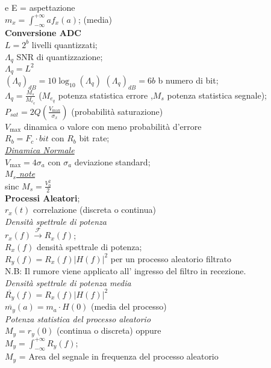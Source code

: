 \documentclass[a4paper]{article}
\begin{document}
\begin{multicols*}{3}
e E = aspettazione\\
$m_x=\int_{-\infty}^{+\infty} a f_x(a)$; (media)\\
\textbf{Conversione ADC} \\
$L=2^b$ livelli quantizzati; \\
${\Lambda_q}$ SNR di quantizzazione; \\
$\Lambda_q = L^2$ \\
${({\Lambda}_q)}_{dB}=10\log_{10}{(\Lambda_q)}$
${(\Lambda_q)}_{dB} = 6b$ b numero di bit; \\
${\Lambda}_q=\frac{M_s}{M_{e_q}}$ ($M_{e_q}$ potenza statistica errore
,$M_s$ potenza statistica segnale); \\
$P_{sat}=2Q(\frac{V_{\max}}{\sigma_x})$ (probabilità saturazione) \\
$V_{\max}$ dinamica o valore con meno probabilità d'errore \\
$R_b=F_c \cdot bit$ con $R_b$ bit rate; \\
\underline{\textit{Dinamica Normale}} \\
$V_{\max} = 4\sigma_a$ con $\sigma_a$ deviazione standard;\\ 
\underline{\textit{$M_s$ note}} \\
sinc $M_s = \frac{V_0^2}{2}$ \\
\textbf{Processi Aleatori}; \\
$r_x(t)$ correlazione (discreta o continua) \\
\textit{Densità spettrale di potenza} \\
$r_x(f) \xrightarrow{\mathscr{F}} R_x(f)$; \\ 
$R_x(f)$ densità spettrale di potenza; \\
$R_y(f) = R_x(f) |H(f)|^2$ per un processo aleatorio filtrato\\
N.B: Il rumore viene applicato all' ingresso del filtro in recezione. \\
\textit{Densità spettrale di potenza media} \\
$\overline{R_y}(f) = R_x(f) |H(f)|^2$ \\
$\overline{m_y}(a)=m_a\cdot H(0)$ (media del processo)\\
\textit{Potenza statistica del processo aleatorio} \\
$M_y = r_y(0)$ (continua o discreta) oppure \\
$M_y = \int_{-\infty}^{+\infty} R_y(f)$;\\
$M_y$ = Area del segnale in frequenza del processo aleatorio \\

\end{multicols*}
\end{document}
